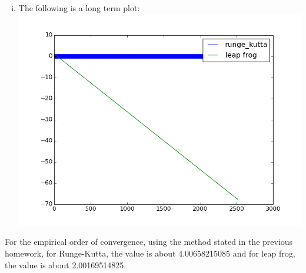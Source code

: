 \documentclass[a4paper, 12pt]{article}
\begin{document}
\begin{enumerate}[(a)]
\begin{enumerate}[(i)]
	  	\item The following is a long term plot: \\
	  		\includegraphics[scale=.5]{fig1_5.png}
	\end{enumerate} 
	For the empirical order of convergence, using the method stated in the previous homework, for Runge-Kutta, the value is about 4.00658215085 and for leap frog, the value is about 2.00169514825.


\end{enumerate}
\end{document}
